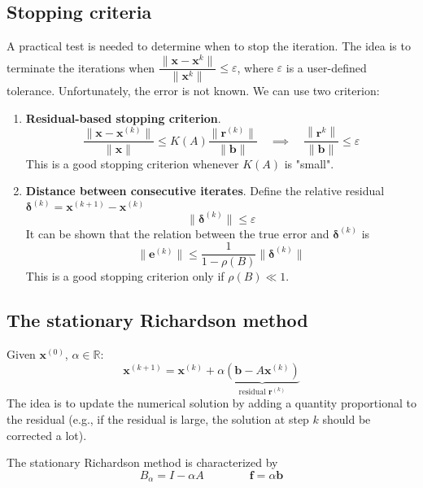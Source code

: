 \subsection{Stopping criteria}

A practical test is needed to determine when to stop the iteration.
The idea is to terminate the iterations when $\dfrac{\lVert \mathbf{x} - \mathbf{x}^{k} \rVert}{\lVert \mathbf{x}^{k} \rVert} \leq \varepsilon$,
where $\varepsilon$ is a user-defined tolerance.
Unfortunately, the error is not known. We can use two criterion:

\begin{enumerate}
    \item \textbf{Residual-based stopping criterion}.
          $$
              \frac{\lVert \mathbf{x} - \mathbf{x}^{(k)} \rVert }{\lVert \mathbf{x} \rVert }
              \leq
              K(A) \frac{\lVert \mathbf{r}^{(k)} \rVert }{\lVert \mathbf{b} \rVert }
              \quad \implies \quad
              \boxed{\frac{\left\lVert  \mathbf{r}^{k} \right\rVert }{\lVert \mathbf{b} \rVert } \leq \varepsilon}
          $$
          This is a good stopping criterion whenever $K(A)$ is "small".
    \item \textbf{Distance between consecutive iterates}.
          Define the relative residual $\boldsymbol{\delta}^{(k)} = \mathbf{x}^{(k+1)} - \mathbf{x}^{(k)}$
          $$
              \boxed{\lVert \boldsymbol{\delta}^{(k)} \rVert \leq \varepsilon}
          $$
          It can be shown that the relation between the true error and $\boldsymbol{\delta}^{(k)}$ is
          $$
              \lVert \mathbf{e}^{(k)} \rVert \leq \frac{1}{1 - \rho(B)} \lVert \boldsymbol{\delta}^{(k)} \rVert
          $$
          This is a good stopping criterion only if $\rho(B) \ll 1$.
\end{enumerate}

\subsection{The stationary Richardson method}

Given $\mathbf{x}^{(0)}$, $\alpha \in \mathbb{R}$:
$$
    \mathbf{x}^{(k+1)} = \mathbf{x}^{(k)} + \alpha \underbrace{(\mathbf{b} - A \mathbf{x}^{(k)})}_{\text{residual }\mathbf{r}^{(k)}}
$$
The idea is to update the numerical solution by adding a quantity proportional to the residual (e.g., if the residual is large, the solution at step $k$ should be corrected a lot).

The stationary Richardson method is characterized by
$$
    B_{\alpha} = I - \alpha A \qquad \qquad \mathbf{f} = \alpha \mathbf{b}
$$

